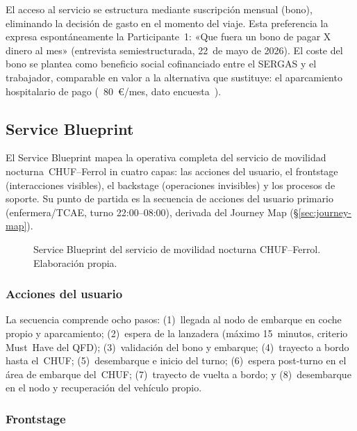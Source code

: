 El acceso al servicio se estructura mediante suscripción mensual
(bono), eliminando la decisión de gasto en el momento del viaje.
Esta preferencia la expresa espontáneamente la Participante~1:
«Que fuera un bono de pagar X dinero al mes» (entrevista
semiestructurada, 22~de mayo de 2026). El coste del bono se
plantea como beneficio social cofinanciado entre el \acs{SERGAS}
y el trabajador, comparable en valor a la alternativa que
sustituye: el aparcamiento hospitalario de pago (~80~€/mes,
dato encuesta~\parencite{LouridoRegueira2026}).

\subsection{Service Blueprint}
\label{sec:service-blueprint}

El Service Blueprint mapea la operativa completa del servicio
de movilidad nocturna~CHUF--Ferrol in cuatro capas: las acciones
del usuario, el frontstage (interacciones visibles), el backstage
(operaciones invisibles) y los procesos de soporte. Su punto de
partida es la secuencia de acciones del usuario primario
(enfermera/\acs{TCAE}, turno 22:00--08:00), derivada del Journey
Map (§\ref{sec:journey-map}).

\begin{figure}[htbp]
  \centering
  \fbox{\rule{0pt}{12cm}\rule{0.95\textwidth}{0pt}}
  \caption{Service Blueprint del servicio de movilidad nocturna
    \acs{CHUF}--Ferrol. Elaboración propia.}
  \label{fig:blueprint}
\end{figure}

\subsubsection{Acciones del usuario}

La secuencia comprende ocho pasos: (1)~llegada al nodo de embarque
en coche propio y aparcamiento; (2)~espera de la lanzadera
(máximo 15~minutos, criterio Must~Have del \acs{QFD}); (3)~validación
del bono y embarque; (4)~trayecto a bordo hasta el~\acs{CHUF};
(5)~desembarque e inicio del turno; (6)~espera post-turno en el área
de embarque del~\acs{CHUF}; (7)~trayecto de vuelta a bordo; y
(8)~desembarque en el nodo y recuperación del vehículo propio.

\subsubsection{Frontstage}

